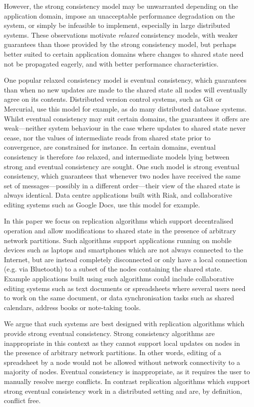 \documentclass[acmlarge,review,anonymous]{acmart}\settopmatter{printfolios=true}
\begin{document}
However, the strong consistency model may be unwarranted depending on the application domain, impose an unacceptable performance degradation on the system, or simply be infeasible to implement, especially in large distributed systems.
These observations motivate \emph{relaxed} consistency models, with weaker guarantees than those provided by the strong consistency model, but perhaps better suited to certain application domains where changes to shared state need not be propagated eagerly, and with better performance characteristics.

One popular relaxed consistency model is eventual consistency, which guarantees than when no new updates are made to the shared state all nodes will eventually agree on its contents.
Distributed version control systems, such as Git or Mercurial, use this model for example, as do many distributed database systems.
Whilst eventual consistency may suit certain domains, the guarantees it offers are weak---neither system behaviour in the case where updates to shared state never cease, nor the values of intermediate reads from shared state prior to convergence, are constrained for instance.
In certain domains, eventual consistency is therefore \emph{too} relaxed, and intermediate models lying between strong and eventual consistency are sought.
One such model is strong eventual consistency, which guarantees that whenever two nodes have received the same set of messages---possibly in a different order---their view of the shared state is always identical.
Data centre applications built with Riak, and collaborative editing systems such as Google Docs, use this model for example.

In this paper we focus on replication algorithms which support decentralised operation and allow modifications to shared state in the presence of arbitrary network partitions.
Such algorithms support applications running on mobile devices such as laptops and smartphones which are not always connected to the Internet, but are instead completely disconnected or only have a local connection (e.g. via Bluetooth) to a subset of the nodes containing the shared state.
Example applications built using such algorithms could include collaborative editing systems such as text documents or spreadsheets where several users need to work on the same document, or data synchronisation tasks such as shared calendars, address books or note-taking tools.

We argue that such systems are best designed with replication algorithms which provide strong eventual consistency. Strong consistency algorithms are inappropriate in this context as they cannot support local updates on nodes in the presence of arbitrary network partitions.
In other words, editing of a spreadsheet by a node would not be allowed without network connectivity to a majority of nodes.
Eventual consistency is inappropriate, as it requires the user to manually resolve merge conflicts.
In contrast replication algorithms which support strong eventual consistency work in a distributed setting and are, by definition, conflict free.
\end{document}
